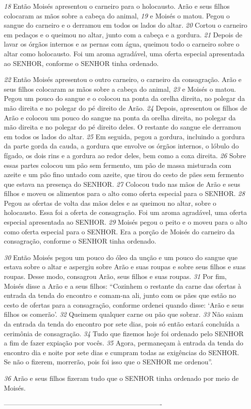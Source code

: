 \smallskip
\textit{\tiny 18}
Então Moisés apresentou o carneiro para o holocausto. Arão e seus filhos
colocaram as mãos sobre a cabeça do animal, 
\textit{\tiny 19}
e Moisés o matou. Pegou o sangue
do carneiro e o derramou em todos os lados do altar. 
\textit{\tiny 20}
Cortou o carneiro em
pedaços e o queimou no altar, junto com a cabeça e a gordura. 
\textit{\tiny 21}
Depois de lavar
os órgãos internos e as pernas com água, queimou todo o carneiro sobre o altar
como holocausto. Foi um aroma agradável, uma oferta especial apresentada ao
SENHOR, conforme o SENHOR tinha ordenado.
   
\smallskip
\textit{\tiny 22}
Então Moisés apresentou o outro carneiro, o carneiro da consagração. Arão e
seus filhos colocaram as mãos sobre a cabeça do animal, 
\textit{\tiny 23}
e Moisés o matou.
Pegou um pouco do sangue e o colocou na ponta da orelha direita, no polegar da
mão direita e no polegar do pé direito de Arão. 
\textit{\tiny 24}
Depois, apresentou os filhos de
Arão e colocou um pouco do sangue na ponta da orelha direita, no polegar da mão
direita e no polegar do pé direito deles. O restante do sangue ele derramou em
todos os lados do altar.
\textit{\tiny 25}
Em seguida, pegou a gordura, incluindo a gordura da parte gorda da cauda, a
gordura que envolve os órgãos internos, o lóbulo do fígado, os dois rins e a
gordura ao redor deles, bem como a coxa direita. 
\textit{\tiny 26}
Sobre essas partes colocou um
pão sem fermento, um pão de massa misturada com azeite e um pão fino untado
com azeite, que tirou do cesto de pães sem fermento que estava na presença do
SENHOR. 
\textit{\tiny 27}
Colocou tudo nas mãos de Arão e seus filhos e moveu os alimentos para
o alto como oferta especial para o SENHOR. 
\textit{\tiny 28}
Pegou as ofertas de volta das mãos
deles e as queimou no altar, sobre o holocausto. Essa foi a oferta de consagração.
Foi um aroma agradável, uma oferta especial apresentada ao SENHOR. 
\textit{\tiny 29}
Moisés
pegou o peito e o moveu para o alto como oferta especial para o SENHOR. Era a
porção de Moisés do carneiro da consagração, conforme o SENHOR tinha
ordenado.
   
\smallskip
\textit{\tiny 30}
Então Moisés pegou um pouco do óleo da unção e um pouco do sangue que
estava sobre o altar e aspergiu sobre Arão e suas roupas e sobre seus filhos e suas
roupas. Desse modo, consagrou Arão, seus filhos e suas roupas.
\textit{\tiny 31}
Por fim, Moisés disse a Arão e a seus filhos: “Cozinhem o restante da carne
das ofertas à entrada da tenda do encontro e comam-na ali, junto com os pães que
estão no cesto de ofertas para a consagração, conforme ordenei quando disse:
‘Arão e seus filhos os comerão’. 
\textit{\tiny 32}
Queimem qualquer carne ou pão que sobrar.
\textit{\tiny 33}
Não saiam da entrada da tenda do encontro por sete dias, pois só então estará
concluída a cerimônia de consagração. 
\textit{\tiny 34}
Tudo que fizemos hoje foi ordenado
pelo SENHOR a fim de fazer expiação por vocês. 
\textit{\tiny 35}
Agora, permaneçam à entrada
da tenda do encontro dia e noite por sete dias e cumpram todas as exigências do
SENHOR. Se não o fizerem, morrerão, pois foi isso que o SENHOR me ordenou”.

\smallskip
\textit{\tiny 36}
Arão e seus filhos fizeram tudo que o SENHOR tinha ordenado por meio de
Moisés.



----------------------------------------------------------------------
